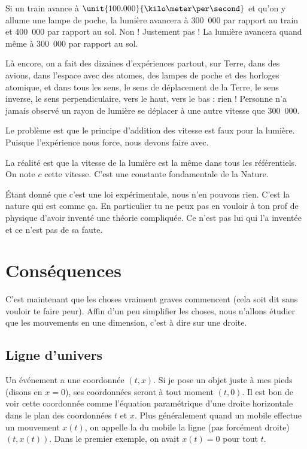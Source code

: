 Si un train avance à $\unit{100.000}{\kilo\meter\per\second}$ et qu'on y allume une lampe de poche, la lumière avancera à \unit{300.000}{\kilo\meter\per\second} par rapport au train et \unit{400.000}{\kilo\meter\per\second} par rapport au sol. Non ! Justement pas ! La lumière avancera quand même à \unit{300.000}{\kilo\meter\per\second} par rapport au sol.

Là encore, on a fait des dizaines d'expériences partout, sur Terre, dans des avions, dans l'espace avec des atomes, des lampes de poche et des horloges atomique, et dans tous les sens, le sens de déplacement de la Terre, le sens inverse, le sens perpendiculaire, vers le haut, vers le bas : rien ! Personne n'a jamais observé un rayon de lumière se déplacer à une autre vitesse que \unit{300.000}{\kilo\meter\per\second}.

Le problème est que le principe d'addition des vitesse est faux pour la lumière. Puisque l'expérience nous force, nous devons faire avec. 

\begin{loiphyz}		\label{LoiVitLum}
La réalité est que la vitesse de la lumière est la même dans tous les référentiels. On note $c$ cette vitesse. C'est une constante fondamentale de la Nature.
\end{loiphyz}
Étant donné que c'est une loi expérimentale, nous n'en pouvons rien. C'est la nature qui est comme ça. En particulier tu ne peux pas en vouloir à ton prof de physique d'avoir inventé une théorie compliquée. Ce n'est pas lui qui l'a inventée et ce n'est pas de sa faute.


\section{Conséquences}

C'est maintenant que les choses vraiment graves commencent (cela soit dit sans vouloir te faire peur). Affin d'un peu simplifier les choses, nous n'allons  étudier que les mouvements en une dimension, c'est à dire sur une droite.

\subsection{Ligne d'univers}

Un événement a une coordonnée $(t,x)$. Si je pose un objet juste à mes pieds (disons en $x=0$), ses coordonnées seront à tout moment $(t,0)$. Il est bon de voir cette coordonnée comme l'équation paramétrique d'une droite horizontale dans le plan des coordonnées $t$ et $x$. Plus généralement quand un mobile effectue un mouvement $x(t)$, on appelle la  du mobile la ligne (pas forcément droite) $(t,x(t))$. Dans le premier exemple, on avait $x(t)=0$ pour tout $t$.

